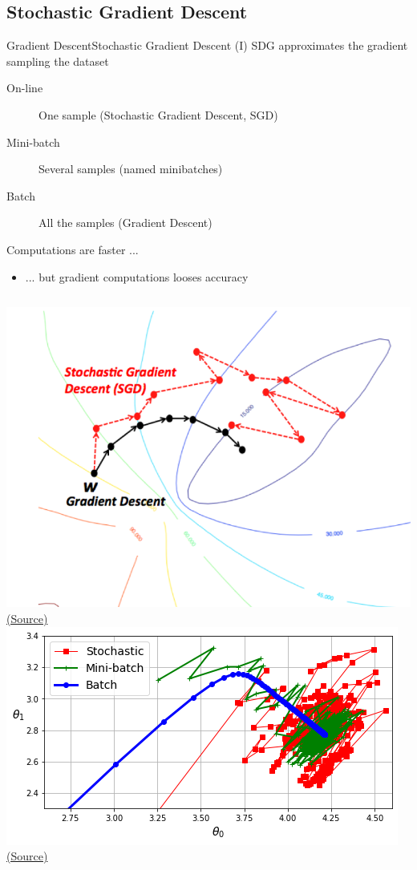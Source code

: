 \documentclass[10pt,compress]{beamer} %
\begin{document}
\subsection{Stochastic Gradient Descent}
\begin{frame}{Gradient Descent}{Stochastic Gradient Descent (I)}
	SDG approximates the gradient sampling the dataset
	\begin{description}
		\item[On-line] One sample (Stochastic Gradient Descent, SGD)
		\item[Mini-batch] Several samples (named minibatches)
		\item[Batch] All the samples (Gradient Descent)
	\end{description}

    	Computations are faster ...
	\begin{itemize}
		\item ... but gradient computations looses accuracy
	\end{itemize}

	\centering

    \begin{columns}
	\centering \includegraphics[width=0.9\linewidth]{figs/sdg.png}\\
	\scriptsize \href{https://wikidocs.net/3413}{(Source)}
	\centering \includegraphics[width=0.9\linewidth]{figs/sgd-comparison.png}\\
	    \scriptsize \href{https://github.com/tuitet/Hands-On-Machine-Learning-with-Scikit-Learn-Keras-and-TensorFlow-3rd-Edition/blob/main/04_training_linear_models.ipynb}{(Source)}
    \end{columns}
\end{frame}
\end{document}
